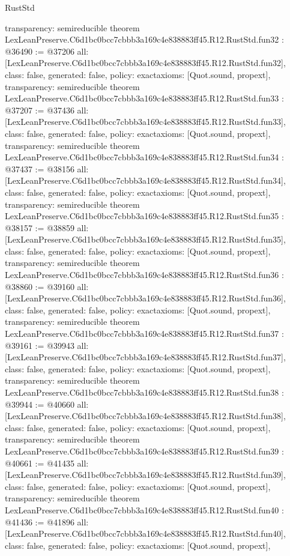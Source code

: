 \begin{lexlean}{RustStd}
\begin{coremodule}
{  transparency: semireducible
}
theorem LexLeanPreserve.C6d1bc0bcc7cbbb3a169c4e838883ff45.R12.RustStd.fun32 : @36490 := @37206 {
  all: [LexLeanPreserve.C6d1bc0bcc7cbbb3a169c4e838883ff45.R12.RustStd.fun32],
  class: false,
  generated: false,
  policy: exact{axioms: [Quot.sound, propext]},
  transparency: semireducible
}
theorem LexLeanPreserve.C6d1bc0bcc7cbbb3a169c4e838883ff45.R12.RustStd.fun33 : @37207 := @37436 {
  all: [LexLeanPreserve.C6d1bc0bcc7cbbb3a169c4e838883ff45.R12.RustStd.fun33],
  class: false,
  generated: false,
  policy: exact{axioms: [Quot.sound, propext]},
  transparency: semireducible
}
theorem LexLeanPreserve.C6d1bc0bcc7cbbb3a169c4e838883ff45.R12.RustStd.fun34 : @37437 := @38156 {
  all: [LexLeanPreserve.C6d1bc0bcc7cbbb3a169c4e838883ff45.R12.RustStd.fun34],
  class: false,
  generated: false,
  policy: exact{axioms: [Quot.sound, propext]},
  transparency: semireducible
}
theorem LexLeanPreserve.C6d1bc0bcc7cbbb3a169c4e838883ff45.R12.RustStd.fun35 : @38157 := @38859 {
  all: [LexLeanPreserve.C6d1bc0bcc7cbbb3a169c4e838883ff45.R12.RustStd.fun35],
  class: false,
  generated: false,
  policy: exact{axioms: [Quot.sound, propext]},
  transparency: semireducible
}
theorem LexLeanPreserve.C6d1bc0bcc7cbbb3a169c4e838883ff45.R12.RustStd.fun36 : @38860 := @39160 {
  all: [LexLeanPreserve.C6d1bc0bcc7cbbb3a169c4e838883ff45.R12.RustStd.fun36],
  class: false,
  generated: false,
  policy: exact{axioms: [Quot.sound, propext]},
  transparency: semireducible
}
theorem LexLeanPreserve.C6d1bc0bcc7cbbb3a169c4e838883ff45.R12.RustStd.fun37 : @39161 := @39943 {
  all: [LexLeanPreserve.C6d1bc0bcc7cbbb3a169c4e838883ff45.R12.RustStd.fun37],
  class: false,
  generated: false,
  policy: exact{axioms: [Quot.sound, propext]},
  transparency: semireducible
}
theorem LexLeanPreserve.C6d1bc0bcc7cbbb3a169c4e838883ff45.R12.RustStd.fun38 : @39944 := @40660 {
  all: [LexLeanPreserve.C6d1bc0bcc7cbbb3a169c4e838883ff45.R12.RustStd.fun38],
  class: false,
  generated: false,
  policy: exact{axioms: [Quot.sound, propext]},
  transparency: semireducible
}
theorem LexLeanPreserve.C6d1bc0bcc7cbbb3a169c4e838883ff45.R12.RustStd.fun39 : @40661 := @41435 {
  all: [LexLeanPreserve.C6d1bc0bcc7cbbb3a169c4e838883ff45.R12.RustStd.fun39],
  class: false,
  generated: false,
  policy: exact{axioms: [Quot.sound, propext]},
  transparency: semireducible
}
theorem LexLeanPreserve.C6d1bc0bcc7cbbb3a169c4e838883ff45.R12.RustStd.fun40 : @41436 := @41896 {
  all: [LexLeanPreserve.C6d1bc0bcc7cbbb3a169c4e838883ff45.R12.RustStd.fun40],
  class: false,
  generated: false,
  policy: exact{axioms: [Quot.sound, propext]},
}
\end{coremodule}
\end{lexlean}
